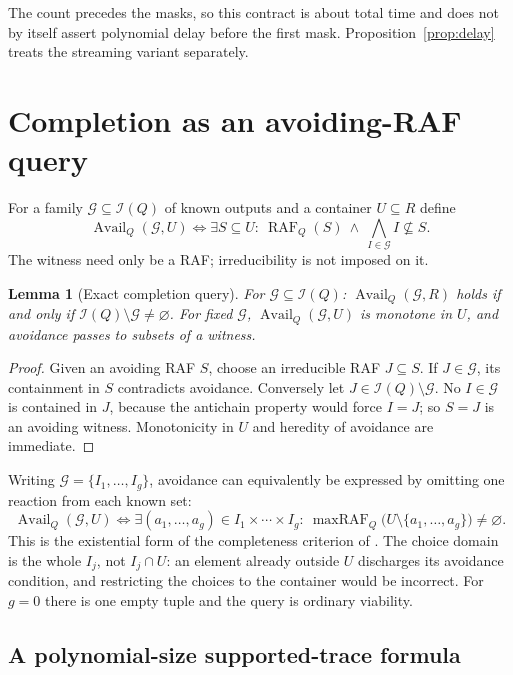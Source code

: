 \documentclass[11pt,a4paper]{article}
\theoremstyle{plain}
\newtheorem{lemma}[theorem]{Lemma}
\theoremstyle{definition}
\theoremstyle{remark}
\newcommand{\Irr}{\mathcal I}
\newcommand{\RAF}{\operatorname{RAF}}
\newcommand{\maxRAF}{\operatorname{maxRAF}}
\newcommand{\Avail}{\operatorname{Avail}}
\newcommand{\cG}{\mathcal G}
\begin{document}
The count precedes the masks, so this contract is about total time and does not by itself assert polynomial delay before the first mask. Proposition~\ref{prop:delay} treats the streaming variant separately.

\section{Completion as an avoiding-RAF query}\label{sec:completion}

For a family $\cG\subseteq\Irr(Q)$ of known outputs and a container $U\subseteq R$ define
\begin{equation}\label{eq:avail}
 \Avail_Q(\cG,U)\iff\exists S\subseteq U:\ \RAF_Q(S)\ \wedge\ \bigwedge_{I\in\cG} I\nsubseteq S .
\end{equation}
The witness need only be a RAF; irreducibility is not imposed on it.

\begin{lemma}[Exact completion query]\label{lem:completion}
For $\cG\subseteq\Irr(Q)$: $\Avail_Q(\cG,R)$ holds if and only if $\Irr(Q)\setminus\cG\neq\varnothing$. For fixed $\cG$, $\Avail_Q(\cG,U)$ is monotone in $U$, and avoidance passes to subsets of a witness.
\end{lemma}
\begin{proof}
Given an avoiding RAF $S$, choose an irreducible RAF $J\subseteq S$. If $J\in\cG$, its containment in $S$ contradicts avoidance. Conversely let $J\in\Irr(Q)\setminus\cG$. No $I\in\cG$ is contained in $J$, because the antichain property would force $I=J$; so $S=J$ is an avoiding witness. Monotonicity in $U$ and heredity of avoidance are immediate.
\end{proof}

Writing $\cG=\{I_1,\dots,I_g\}$, avoidance can equivalently be expressed by omitting one reaction from each known set:
\begin{equation}\label{eq:tuple}
 \Avail_Q(\cG,U)\iff\exists(a_1,\dots,a_g)\in I_1\times\cdots\times I_g:\ \maxRAF_Q\bigl(U\setminus\{a_1,\dots,a_g\}\bigr)\neq\varnothing .
\end{equation}
This is the existential form of the completeness criterion of \cite[Theorem~2]{steel2013minimal}. The choice domain is the whole $I_j$, not $I_j\cap U$: an element already outside $U$ discharges its avoidance condition, and restricting the choices to the container would be incorrect. For $g=0$ there is one empty tuple and the query is ordinary viability.

\subsection{A polynomial-size supported-trace formula}
\end{document}
